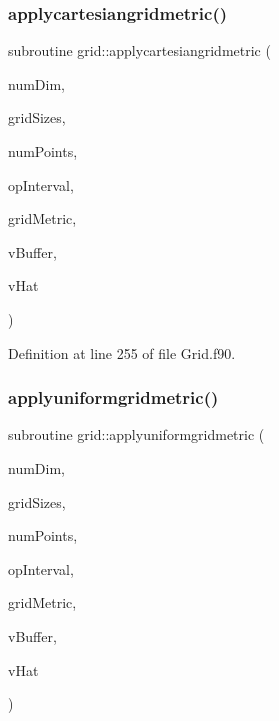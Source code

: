 \subsubsection{\texorpdfstring{applycartesiangridmetric()}{applycartesiangridmetric()}}
{\footnotesize\ttfamily subroutine grid\+::applycartesiangridmetric (\begin{DoxyParamCaption}\item[{integer(kind=4), intent(in)}]{num\+Dim,  }\item[{integer(kind=8), dimension(numdim), intent(in)}]{grid\+Sizes,  }\item[{integer(kind=8), intent(in)}]{num\+Points,  }\item[{integer(kind=8), dimension(2$\ast$numdim), intent(in)}]{op\+Interval,  }\item[{real(kind=8), dimension(numdim$\ast$numpoints), intent(in)}]{grid\+Metric,  }\item[{real(kind=8), dimension(numdim$\ast$numpoints), intent(in)}]{v\+Buffer,  }\item[{real(kind=8), dimension(numdim$\ast$numpoints), intent(out)}]{v\+Hat }\end{DoxyParamCaption})}



Definition at line 255 of file Grid.\+f90.

\hypertarget{namespacegrid_a43b9c1dd56d93e4e53c25044ce190ef9}{}\label{namespacegrid_a43b9c1dd56d93e4e53c25044ce190ef9} 
\subsubsection{\texorpdfstring{applyuniformgridmetric()}{applyuniformgridmetric()}}
{\footnotesize\ttfamily subroutine grid\+::applyuniformgridmetric (\begin{DoxyParamCaption}\item[{integer(kind=4), intent(in)}]{num\+Dim,  }\item[{integer(kind=8), dimension(numdim), intent(in)}]{grid\+Sizes,  }\item[{integer(kind=8), intent(in)}]{num\+Points,  }\item[{integer(kind=8), dimension(2$\ast$numdim), intent(in)}]{op\+Interval,  }\item[{real(kind=8), dimension(numdim), intent(in)}]{grid\+Metric,  }\item[{real(kind=8), dimension(numdim$\ast$numpoints), intent(in)}]{v\+Buffer,  }\item[{real(kind=8), dimension(numdim$\ast$numpoints), intent(out)}]{v\+Hat }\end{DoxyParamCaption})}




